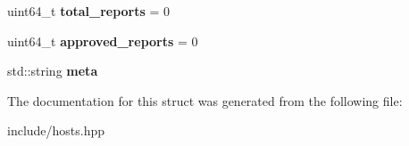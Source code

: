 \begin{DoxyCompactItemize}
\item 
\mbox{\label{structeosio_1_1hosts_ac60cd964287114dce3124089a9aa01cf}} 
uint64\+\_\+t {\bfseries total\+\_\+reports} = 0
\item 
\mbox{\label{structeosio_1_1hosts_a4e6dc24f15714c4328be83b2318fbbc0}} 
uint64\+\_\+t {\bfseries approved\+\_\+reports} = 0
\item 
\mbox{\label{structeosio_1_1hosts_a788e65f4a5cf1d6cfeb659c7b5d0afcc}} 
std\+::string {\bfseries meta}
\end{DoxyCompactItemize}


The documentation for this struct was generated from the following file\+:\begin{DoxyCompactItemize}
\item 
include/hosts.\+hpp\end{DoxyCompactItemize}
